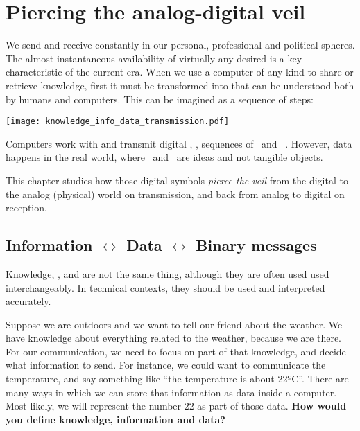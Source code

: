 
\chapter{Piercing the analog-digital veil}\label{sec:piercing}

We send and receive  constantly in our personal, professional and political spheres.
The almost-instantaneous availability of virtually any desired  is a key characteristic of the current era.
% 
When we use a computer of any kind to share or retrieve knowledge, first it must be transformed into  that can be understood both by humans and computers.
This can be imagined as a sequence of steps:
\begin{center}
\texttt{[image: knowledge\_info\_data\_transmission.pdf]}
\end{center}

Computers work with and transmit digital , \ie, sequences of 
\zero\ and \one\ . 
However, data  happens in the real world, where \zero\ and \one\ are ideas and not tangible objects.

This chapter studies how those digital symbols \textit{pierce the veil}  
from the digital to the analog (physical) world on transmission, and back from analog to digital on reception.


\section{Information $\leftrightarrow$ Data $\leftrightarrow$ Binary messages}\label{sec:piercing:information_binary}

Knowledge, , and  are not the same thing, 
although they are often used used interchangeably. In technical contexts, they should be used and interpreted accurately.
% 
\begin{exercise}
Suppose we are outdoors and we want to tell our friend about the weather.
% 
We have knowledge about everything related to the weather, because we are there.
For our communication, we need to focus on part of that knowledge, and decide what information to send.
For instance, we could want to communicate the temperature, and say something like ``the temperature is about 22ºC''.
% 
There are many ways in which we can store that information as data inside a computer. Most likely, we will represent the number 
$22$ as part of those data. \textbf{How would you define knowledge, information and data?}
\end{exercise}


